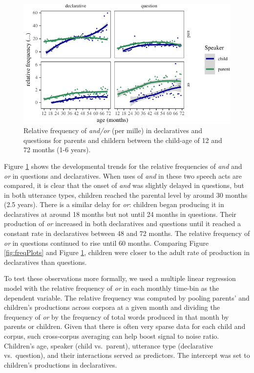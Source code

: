 \documentclass[
  english,
  ,man,floatsintext]{apa6}
\begin{document}
\begin{figure}[H]

{\centering \includegraphics{figs/ageSpeechActPlot-1} 

}

\caption{Relative frequency of \textit{and/or} (per mille) in declaratives and questions for parents and childern between the child-age of 12 and 72 months (1-6 years).}\label{fig:ageSpeechActPlot}
\end{figure}

Figure \ref{fig:ageSpeechActPlot} shows the developmental trends for the relative frequencies of \emph{and} and \emph{or} in questions and declaratives. When uses of \emph{and} in these two speech acts are compared, it is clear that the onset of \emph{and} was slightly delayed in questions, but in both utterance types, children reached the parental level by around 30 months (2.5 years). There is a similar delay for \emph{or}: children began producing it in declaratives at around 18 months but not until 24 months in questions. Their production of \emph{or} increased in both declaratives and questions until it reached a constant rate in declaratives between 48 and 72 months. The relative frequency of \emph{or} in questions continued to rise until 60 months. Comparing Figure \ref{fig:freqPlots} and Figure \ref{fig:ageSpeechActPlot}, children were closer to the adult rate of production in declaratives than questions.

To test these observations more formally, we used a multiple linear regression model with the relative frequency of \emph{or} in each monthly time-bin as the dependent variable. The relative frequency was computed by pooling parents' and children's productions across corpora at a given month and dividing the frequency of \emph{or} by the frequency of total words produced in that month by parents or children. Given that there is often very sparse data for each child and corpus, such cross-corpus averaging can help boost signal to noise ratio. Children's age, speaker (child vs.~parent), utterance type (declarative vs.~question), and their interactions served as predictors. The intercept was set to children's productions in declaratives.
\end{document}
